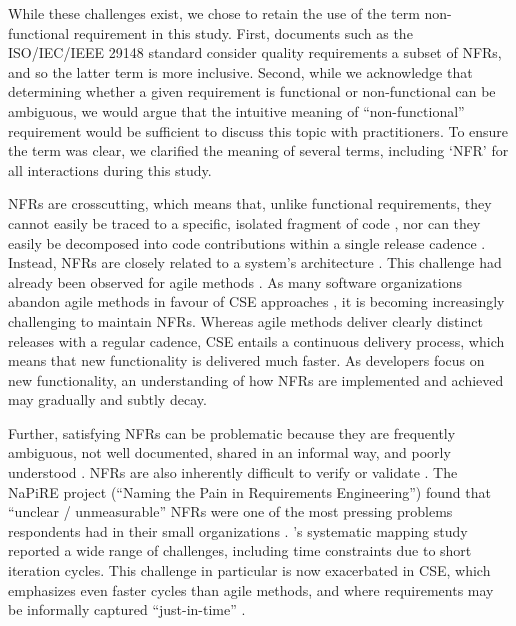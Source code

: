 \documentclass[smallextended]{svjour3}        %
\begin{document}
While these challenges exist, we chose to retain the use of the term non-functional requirement in this study.
First, documents such as the ISO/IEC/IEEE 29148 standard consider quality requirements a subset of NFRs, and so the latter term is more inclusive. Second, while we acknowledge that determining whether a given requirement is functional or non-functional can be ambiguous, we would argue that the intuitive meaning of ``non-functional'' requirement would be sufficient to discuss this topic with practitioners. To ensure the term was clear, we clarified the meaning of several terms, including `NFR' for all interactions during this study. 




NFRs are crosscutting, which means that, unlike functional requirements, they cannot easily be traced to a specific, isolated fragment of code \citep{bellomo_evolutionary_2014,glinz_non-functional_2007}, nor can they easily be decomposed into code contributions within a single release cadence \citep{bellomo_evolutionary_2014}. Instead, NFRs are closely related to a system's architecture \citep{harrison2007leveraging,garlan1995software}. 
This challenge had already been observed for agile methods \citep{nasir2023exploratory,rahy2022managing,behutiye2020management}.
As many software organizations abandon agile methods in favour of CSE approaches \citep{bosch2014continuous, fitzgerald2017continuous, olsson2014towards}, it is becoming increasingly challenging to maintain NFRs. Whereas agile methods deliver clearly distinct releases with a regular cadence, CSE entails a continuous delivery process, which means that new functionality is delivered much faster. As developers focus on new functionality, an understanding of how NFRs are implemented and achieved may gradually and subtly decay. 

Further, satisfying NFRs can be problematic because they are frequently ambiguous, not well documented, shared in an informal way, and poorly understood \citep{chung2012non, ameller_how_2012,ameller2012non}. NFRs are also inherently difficult to verify or validate \citep{borg2003bad, jiang_co-evolution_2015}.
The NaPiRE project (``Naming the Pain in Requirements Engineering'') \citep{Fernandez2018,wagner2019status} 
found that ``unclear / unmeasurable'' NFRs were one of the most pressing problems respondents had in their small organizations \citep{mendez2017naming}. 
\cite{behutiye2020management}'s systematic mapping study reported 
a wide range of challenges, including time constraints due to short iteration cycles. 
This challenge in particular is now exacerbated in CSE, which emphasizes even faster cycles than agile methods, and where requirements may be informally captured ``just-in-time'' \citep{ernst_case_2012}.
\end{document}
